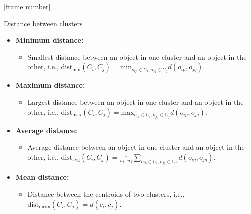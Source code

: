 \documentclass[aspectratio=169,t,xcolor=dvipsnames]{beamer}
\begin{document}
  { %
    [frame number]
    \begin{frame}{Distance between clusters}
      \begin{itemize}
        \item \textbf{Minimum distance:}
        \begin{itemize}
          \item Smallest distance between an object in one cluster and an object in the other, i.e., $\text{dist}_{\text{min}} (C_i, C_j) = \text{min}_{o_{ip} \in C_i, o_{jq} \in C_j} d(o_{ip}, o_{jq})$.
        \end{itemize}
        \item \textbf{Maximum distance:}
        \begin{itemize}
          \item Largest distance between an object in one cluster and an object in the other, i.e., $\text{dist}_\text{max}(C_i, C_j) = \text{max}_{o_{ip} \in C_i, o_{jq} \in C_j} d(o_{ip}, o_{jq}).$
        \end{itemize}
        \item \textbf{Average distance:}
        \begin{itemize}
          \item Average distance between an object in one cluster and an object in the other, i.e., $\text{dist}_{\text{avg}} (C_i, C_j) = \frac{1}{n_i \cdot n_j} \sum_{o_{ip} \in C_i, o_{jq} \in C_j} d(o_{ip}, o_{jq}).$
        \end{itemize}
        \item \textbf{Mean distance:}
        \begin{itemize}
          \item Distance between the centroids of two clusters, i.e., $\text{dist}_{\text{mean}} (C_i, C_j) = d(c_i, c_j).$
        \end{itemize}
      \end{itemize}
    \end{frame}
  }
\end{document}
